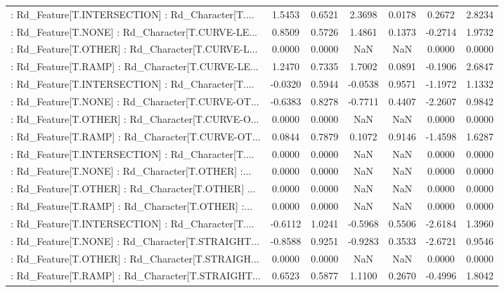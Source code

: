 \begin{longtable}{p{4cm}cccccc}
 : Rd\_Feature[T.INTERSECTION] : Rd\_Character[T.... &  1.5453 &    0.6521 &  2.3698 &       0.0178 &  0.2672 &  2.8234 \\
 : Rd\_Feature[T.NONE] : Rd\_Character[T.CURVE-LE... &  0.8509 &    0.5726 &  1.4861 &       0.1373 & -0.2714 &  1.9732 \\
 : Rd\_Feature[T.OTHER] : Rd\_Character[T.CURVE-L... &  0.0000 &    0.0000 &     NaN &          NaN &  0.0000 &  0.0000 \\
 : Rd\_Feature[T.RAMP] : Rd\_Character[T.CURVE-LE... &  1.2470 &    0.7335 &  1.7002 &       0.0891 & -0.1906 &  2.6847 \\
 : Rd\_Feature[T.INTERSECTION] : Rd\_Character[T.... & -0.0320 &    0.5944 & -0.0538 &       0.9571 & -1.1972 &  1.1332 \\
 : Rd\_Feature[T.NONE] : Rd\_Character[T.CURVE-OT... & -0.6383 &    0.8278 & -0.7711 &       0.4407 & -2.2607 &  0.9842 \\
 : Rd\_Feature[T.OTHER] : Rd\_Character[T.CURVE-O... &  0.0000 &    0.0000 &     NaN &          NaN &  0.0000 &  0.0000 \\
 : Rd\_Feature[T.RAMP] : Rd\_Character[T.CURVE-OT... &  0.0844 &    0.7879 &  0.1072 &       0.9146 & -1.4598 &  1.6287 \\
 : Rd\_Feature[T.INTERSECTION] : Rd\_Character[T.... &  0.0000 &    0.0000 &     NaN &          NaN &  0.0000 &  0.0000 \\
 : Rd\_Feature[T.NONE] : Rd\_Character[T.OTHER] :... &  0.0000 &    0.0000 &     NaN &          NaN &  0.0000 &  0.0000 \\
 : Rd\_Feature[T.OTHER] : Rd\_Character[T.OTHER] ... &  0.0000 &    0.0000 &     NaN &          NaN &  0.0000 &  0.0000 \\
 : Rd\_Feature[T.RAMP] : Rd\_Character[T.OTHER] :... &  0.0000 &    0.0000 &     NaN &          NaN &  0.0000 &  0.0000 \\
 : Rd\_Feature[T.INTERSECTION] : Rd\_Character[T.... & -0.6112 &    1.0241 & -0.5968 &       0.5506 & -2.6184 &  1.3960 \\
 : Rd\_Feature[T.NONE] : Rd\_Character[T.STRAIGHT... & -0.8588 &    0.9251 & -0.9283 &       0.3533 & -2.6721 &  0.9546 \\
 : Rd\_Feature[T.OTHER] : Rd\_Character[T.STRAIGH... &  0.0000 &    0.0000 &     NaN &          NaN &  0.0000 &  0.0000 \\
 : Rd\_Feature[T.RAMP] : Rd\_Character[T.STRAIGHT... &  0.6523 &    0.5877 &  1.1100 &       0.2670 & -0.4996 &  1.8042 \\

\end{longtable}
